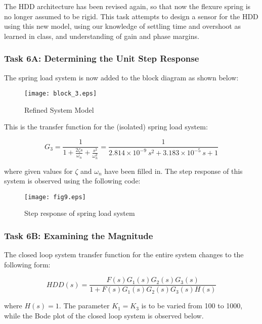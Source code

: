 \documentclass{article}
\newcommand{\matlab}[1]{%
%
}
\begin{document}
The HDD architecture has been revised again, so that now the flexure spring
is no longer assumed to be rigid. This task attempts to design a sensor for the
HDD using this new model, using our knowledge of settling time and overshoot
as learned in class, and understanding of gain and phase margins.

\subsubsection*{Task 6A: Determining the Unit Step Response}

The spring load system is now added to the block diagram as shown below:

\begin{figure}[H]
  \centering
  \caption{Refined System Model}
  \texttt{[image: block\_3.eps]}
\end{figure}

This is the transfer function for the (isolated) spring load system:

$$G_3 = \frac{1}{1 + \frac{2\zeta s}{\omega_n} + \frac{s^2}{\omega_n^2}}
      = \frac{1}{2.814\times 10^{-9} ~ s^2 + 3.183\times 10^{-5} ~ s + 1}$$

\noindent
where given values for $\zeta$ and $\omega_n$ have been filled in.
The step response of this system is observed using the following code:

\matlab{fig9.m}

\begin{figure}[H]
  \caption{Step response of spring load system}
  \centering
  \texttt{[image: fig9.eps]}
\end{figure}

\subsubsection*{Task 6B: Examining the Magnitude}

The closed loop system transfer function for the entire system changes
to the following form:

$$HDD(s) = \frac{F(s)G_1(s)G_2(s)G_3(s)}{1 + F(s)G_1(s)G_2(s)G_3(s)H(s)}$$

\noindent
where $H(s) = 1$.  The parameter $K_1 = K_3$ is to be varied from 100
to 1000, while the Bode plot of the closed loop system is observed
below.

\matlab{fig10.m}
\end{document}
